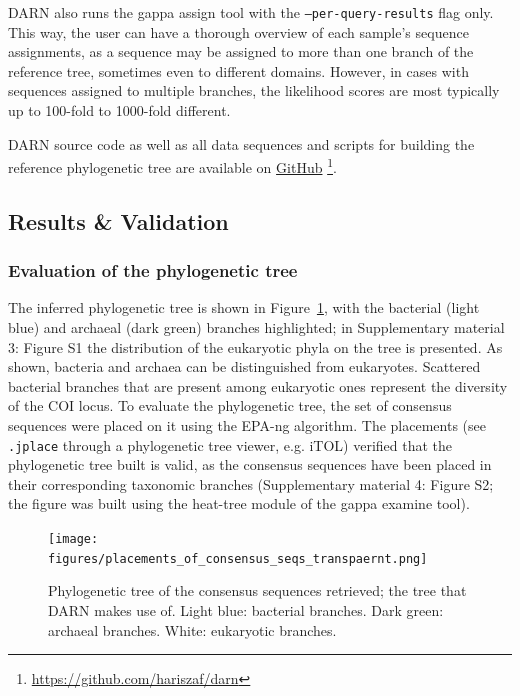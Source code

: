    DARN also runs the gappa assign tool with the \texttt{--per-query-results} flag only. 
   This way, the user can have a thorough overview of each sample’s sequence assignments, as a sequence may be assigned to more than one branch of the reference tree, sometimes even to different domains. 
   However, in cases with sequences assigned to multiple branches, the likelihood scores are most typically up to 100-fold to 1000-fold different.

   DARN source code as well as all data sequences and scripts for building the reference phylogenetic tree are available on \href{https://github.com/hariszaf/darn}{GitHub} \footnote{
      \href{https://github.com/hariszaf/darn}{https://github.com/hariszaf/darn}
   }.



   \subsection{Results \& Validation}
   \label{darn-results}
   \subsubsection{Evaluation of the phylogenetic tree}
   \label{darn-results-tree-evaluation}

   The inferred phylogenetic tree is shown in Figure~\ref{fig:darn-ref-placements}, with the bacterial (light blue) and archaeal (dark green) branches highlighted;
   in Supplementary material 3: Figure S1 the distribution of the eukaryotic phyla on the tree is presented. 
   As shown, bacteria and archaea can be distinguished from eukaryotes. 
   Scattered bacterial branches that are present among eukaryotic ones represent the diversity of the COI locus. 
   To evaluate the phylogenetic tree, the set of consensus sequences were placed on it using the EPA-ng algorithm. 
   The placements (see \texttt{.jplace} through a phylogenetic tree viewer, e.g. iTOL) verified that the phylogenetic tree built is valid, as the consensus sequences have been placed in their corresponding taxonomic branches (Supplementary material 4: Figure S2; the figure was built using the heat-tree module of the gappa examine tool).

   \begin{figure}[h]
      \centering
      \texttt{[image: figures/placements\_of\_consensus\_seqs\_transpaernt.png]}
      \caption[Placements of the consensus COI sequences on the reference COI tree]{
         Phylogenetic tree of the consensus sequences retrieved; the tree that DARN makes use of. Light blue: bacterial branches. 
         Dark green: archaeal branches. White: eukaryotic branches.
      }
      \label{fig:darn-ref-placements}
   \end{figure}


